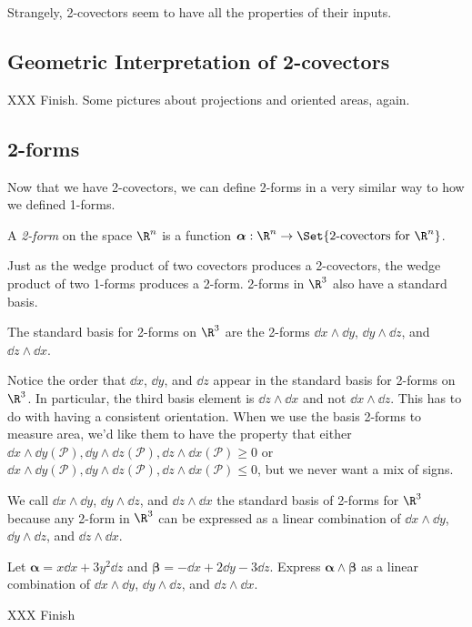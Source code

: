 Strangely, 2-covectors seem to have all the properties of their inputs.

\subsection{Geometric Interpretation of 2-covectors}

XXX Finish.  Some pictures about projections and oriented areas, again.

\subsection{2-forms}

Now that we have 2-covectors, we can define 2-forms in a very similar way to
how we defined 1-forms.

\begin{definition}[2-form]
	A \emph{2-form} on the space $\R^n$ is a function $\bm\alpha:
	\R^n\to \Set{\text{2-covectors for }\R^n}$.
\end{definition}

Just as the wedge product of
two covectors produces a 2-covectors, the wedge
product of two 1-forms produces a 2-form.
2-forms in $\R^3$ also have a standard basis.

\begin{definition}
	The standard basis for 2-forms on $\R^3$ are the 2-forms
	$\dd x\wedge \dd y$, $\dd y\wedge \dd z$, and $\dd z \wedge \dd x$.
\end{definition}

Notice the order that $\dd x$, $\dd y$, and $\dd z$ appear in the standard
basis for 2-forms on $\R^3$.  In particular, the third basis element
is $\dd z\wedge \dd x$ and not $\dd x\wedge \dd z$.  This has to do with 
having a consistent
orientation.  When we use the basis 2-forms to measure area, we'd like them
to have the property that either 
$\dd x\wedge \dd y(\mathcal P), \dd y\wedge \dd z(\mathcal P), \dd z\wedge \dd x(\mathcal P)\geq 0$
or 
$\dd x\wedge \dd y(\mathcal P), \dd y\wedge \dd z(\mathcal P), \dd z\wedge \dd x(\mathcal P)\leq 0$,
but we never want a mix of signs.

We call $\dd x\wedge \dd y$, $\dd y\wedge \dd z$, and $\dd z \wedge \dd x$
the standard basis of 2-forms for $\R^3$ because any 2-form in $\R^3$ can
be expressed as a linear combination of 
$\dd x\wedge \dd y$, $\dd y\wedge \dd z$, and $\dd z \wedge \dd x$.

\begin{example}
	Let $\bm \alpha = x\dd x+3y^2\dd z$ and $\bm\beta = -\dd x+2\dd y -3\dd z$.
	Express $\bm \alpha \wedge \bm \beta$ as a linear combination of
	$\dd x\wedge \dd y$, $\dd y\wedge \dd z$, and $\dd z \wedge \dd x$.

	XXX Finish
\end{example}

